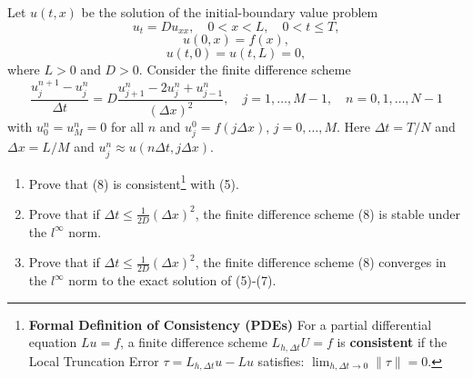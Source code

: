 \begin{exercise}
\label{applied:2023:5}
Let $u(t, x)$ be the solution of the initial-boundary value problem
\begin{equation}
    u_t = D u_{xx}, \quad 0 < x < L, \quad 0 < t \leq T, \tag{5}
\end{equation}
\begin{equation}
    u(0, x) = f(x), \tag{6}
\end{equation}
\begin{equation}
    u(t, 0) = u(t, L) = 0, \tag{7}
\end{equation}
where $L > 0$ and $D > 0$. Consider the finite difference scheme
\begin{equation}
    \frac{u_j^{n+1} - u_j^n}{\Delta t} = D \frac{u_{j+1}^n - 2u_j^n + u_{j-1}^n}{(\Delta x)^2}, \quad j = 1, \dots, M-1, \quad n = 0, 1, \dots, N-1 \tag{8}
\end{equation}
with $u_0^n = u_M^n = 0$ for all $n$ and $u_j^0 = f(j\Delta x)$, $j = 0, \dots, M$. Here $\Delta t = T/N$ and $\Delta x = L/M$ and $u_j^n \approx u(n\Delta t, j\Delta x)$.

\begin{enumerate}[label=(\alph*)]
    \item Prove that (8) is consistent\footnote{\textbf{Formal Definition of Consistency (PDEs)} For a partial differential equation $L u = f$, a finite difference scheme $L_{h, \Delta t} U = f$ is \textbf{consistent} if the Local Truncation Error $\tau = L_{h, \Delta t} u - L u$ satisfies: $\lim_{h, \Delta t \to 0} \|\tau\| = 0$.} with (5).
    \item Prove that if $\Delta t \leq \frac{1}{2D} (\Delta x)^2$, the finite difference scheme (8) is stable under the $l^\infty$ norm.
    \item Prove that if $\Delta t \leq \frac{1}{2D} (\Delta x)^2$, the finite difference scheme (8) converges in the $l^\infty$ norm to the exact solution of (5)-(7).
\end{enumerate}
\end{exercise}

